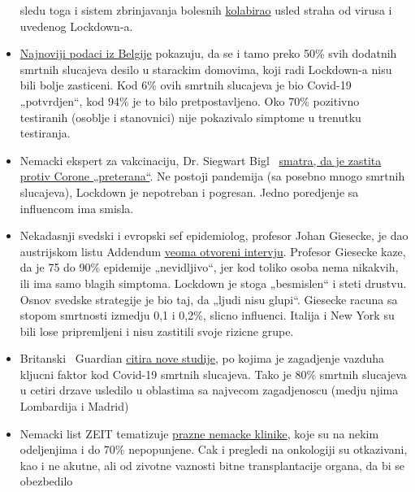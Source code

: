 \begin{itemize}
  sledu toga i sistem zbrinjavanja bolesnih
  \href{https://swprs.org/covid19-bericht-aus-italien/}{kolabirao} usled
  straha od virusa i uvedenog Lockdown-a.
\item
  \href{https://covid-19.sciensano.be/sites/default/files/Covid19/Meest\%20recente\%20update.pdf}{Najnoviji
  podaci iz Belgije} pokazuju, da se i tamo preko 50\% svih dodatnih
  smrtnih slucajeva desilo u starackim domovima, koji radi Lockdown-a
  nisu bili bolje zasticeni. Kod 6\% ovih smrtnih slucajeva je bio
  Covid-19 „potvrdjen``, kod 94\% je to bilo pretpostavljeno. Oko 70\%
  pozitivno testiranih (osoblje i stanovnici) nije pokazivalo simptome u
  trenutku testiranja.
\item
  Nemacki ekspert za vakcinaciju, Dr. Siegwart Bigl
  ~\href{https://www.pressreader.com/germany/dresdner-neueste-nachrichten/20200423/281496458428447}{smatra,
  da je zastita protiv Corone „preterana``}. Ne postoji pandemija (sa
  posebno mnogo smrtnih slucajeva), Lockdown je nepotreban i pogresan.
  Jedno poredjenje sa influencom ima smisla.
\item
  Nekadasnji svedski i evropski sef epidemiolog, profesor Johan
  Giesecke, je dao austrijskom listu Addendum
  \href{https://www.addendum.org/coronavirus/interview-johan-giesecke/}{veoma
  otvoreni intervju}. Profesor Giesecke kaze, da je 75 do 90\% epidemije
  „nevidljivo``, jer kod toliko osoba nema nikakvih, ili ima samo blagih
  simptoma. Lockdown je stoga „besmislen`` i steti drustvu. Osnov
  svedske strategije je bio taj, da „ljudi nisu glupi``. Giesecke racuna
  sa stopom smrtnosti izmedju 0,1 i 0,2\%, slicno influenci. Italija i
  New York su bili lose pripremljeni i nisu zastitili svoje rizicne
  grupe.
\item
  Britanski ~Guardian
  \href{https://www.theguardian.com/environment/2020/apr/20/air-pollution-may-be-key-contributor-to-covid-19-deaths-study?utm_medium}{citira
  nove studije}, po kojima je zagadjenje vazduha kljucni faktor kod
  Covid-19 smrtnih slucajeva. Tako je 80\% smrtnih slucajeva u cetiri
  drzave usledilo u oblastima sa najvecom zagadjenoscu (medju njima
  Lombardija i Madrid)
\item
  Nemacki list ZEIT tematizuje
  \href{https://www.zeit.de/zustimmung?url=https\%3A\%2F\%2Fwww.zeit.de\%2F2020\%2F18\%2Fkliniken-coronavirus-intensivbetten-patienten-behandlung-notaufnahme}{prazne
  nemacke klinike}, koje su na nekim odeljenjima i do 70\% nepopunjene.
  Cak i pregledi na onkologiji su otkazivani, kao i ne akutne, ali od
  zivotne vaznosti bitne transplantacije organa, da bi se obezbedilo

\end{itemize}

